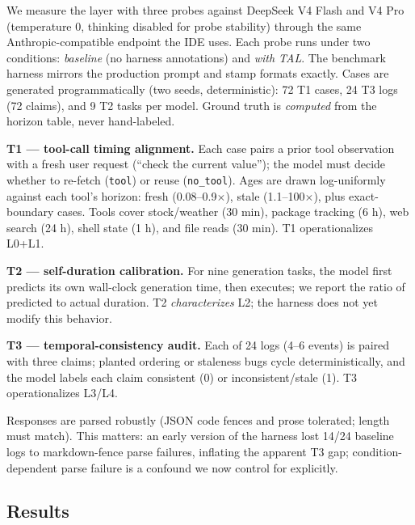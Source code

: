 \documentclass[10pt]{article}
\begin{document}
We measure the layer with three probes against DeepSeek V4 Flash and V4 Pro
(temperature 0, thinking disabled for probe stability) through the same
Anthropic-compatible endpoint the IDE uses. Each probe runs under two conditions:
\emph{baseline} (no harness annotations) and \emph{with TAL}. The benchmark harness
mirrors the production prompt and stamp formats exactly. Cases are generated
programmatically (two seeds, deterministic): 72 T1 cases, 24 T3 logs (72 claims),
and 9 T2 tasks per model. Ground truth is \emph{computed} from the horizon table,
never hand-labeled.

\textbf{T1 --- tool-call timing alignment.} Each case pairs a prior tool observation
with a fresh user request (``check the current value''); the model must decide
whether to re-fetch (\texttt{tool}) or reuse (\texttt{no\_tool}). Ages are drawn
log-uniformly against each tool's horizon: fresh (0.08--0.9$\times$), stale
(1.1--100$\times$), plus exact-boundary cases. Tools cover stock/weather (30 min),
package tracking (6 h), web search (24 h), shell state (1 h), and file reads
(30 min). T1 operationalizes L0+L1.

\textbf{T2 --- self-duration calibration.} For nine generation tasks, the model
first predicts its own wall-clock generation time, then executes; we report the
ratio of predicted to actual duration. T2 \emph{characterizes} L2; the harness does
not yet modify this behavior.

\textbf{T3 --- temporal-consistency audit.} Each of 24 logs (4--6 events) is paired
with three claims; planted ordering or staleness bugs cycle deterministically, and
the model labels each claim consistent (0) or inconsistent/stale (1). T3
operationalizes L3/L4.

Responses are parsed robustly (JSON code fences and prose tolerated; length must
match). This matters: an early version of the harness lost 14/24 baseline logs to
markdown-fence parse failures, inflating the apparent T3 gap; condition-dependent
parse failure is a confound we now control for explicitly.

\subsection{Results}
\label{sec:results}
\end{document}
